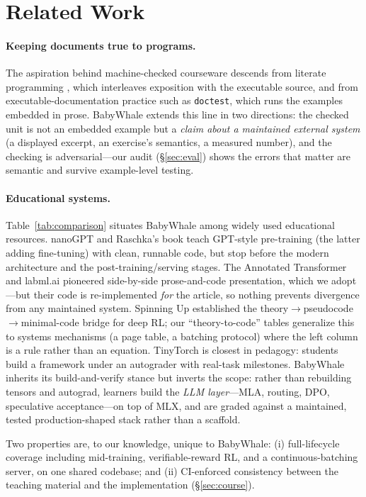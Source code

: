 \section{Related Work}
\label{sec:related}

\paragraph{Keeping documents true to programs.} The aspiration behind
machine-checked courseware descends from literate programming
\citep{knuth1984literate}, which interleaves exposition with the executable
source, and from executable-documentation practice such as \texttt{doctest},
which runs the examples embedded in prose. BabyWhale extends this line in two
directions: the checked unit is not an embedded example but a \emph{claim
about a maintained external system} (a displayed excerpt, an exercise's
semantics, a measured number), and the checking is adversarial---our audit
(\S\ref{sec:eval}) shows the errors that matter are semantic and survive
example-level testing.

\paragraph{Educational systems.}

Table~\ref{tab:comparison} situates BabyWhale among widely used educational
resources. nanoGPT and Raschka's book teach GPT-style pre-training (the latter
adding fine-tuning) with clean, runnable code, but stop before the modern architecture and the
post-training/serving stages. The Annotated Transformer
and labml.ai pioneered side-by-side prose-and-code presentation, which we adopt---but their code is
re-implemented \emph{for} the article, so nothing prevents divergence from any
maintained system. Spinning Up established the
theory$\to$pseudocode$\to$minimal-code bridge for deep RL; our
``theory-to-code'' tables generalize this to systems mechanisms (a page table,
a batching protocol) where the left column is a rule rather than an equation.
TinyTorch \citep{tinytorch2026} is closest in pedagogy: students build a
framework under an autograder with real-task milestones. BabyWhale inherits
its build-and-verify stance but inverts the scope: rather than rebuilding
tensors and autograd, learners build the \emph{LLM layer}---MLA, routing, DPO,
speculative acceptance---on top of MLX, and are graded against a maintained,
tested production-shaped stack rather than a scaffold.

Two properties are, to our knowledge, unique to BabyWhale: (i) full-lifecycle
coverage including mid-training, verifiable-reward RL, and a
continuous-batching server, on one shared codebase; and (ii) CI-enforced
consistency between the teaching material and the implementation
(\S\ref{sec:course}).

